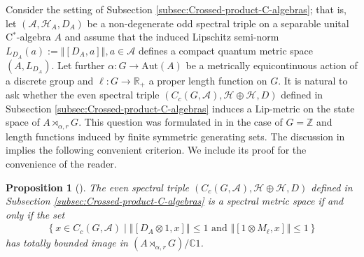 \documentclass[a4paper,11pt,reqno]{amsart}
\numberwithin{equation}{section}
\numberwithin{equation}{section}
\newtheorem{proposition}[theorem]{Proposition}
\theoremstyle{definition}
\theoremstyle{remark}
\theoremstyle{remark}
\begin{document}
Consider the setting of Subsection \ref{subsec:Crossed-product-C-algebras}; that is, let $(\mathcal{A},\mathcal{H}_{A},D_{A})$ be a non-degenerate
odd spectral triple on a separable unital C$^{\ast}$-algebra $A$
and assume that the induced Lipschitz semi-norm $L_{D_{A}}(a):=\left\Vert [D_{A},a]\right\Vert ,a\in\mathcal{A}$
defines a compact quantum metric space $(A,L_{D_{A}})$. Let further
$\alpha:G\rightarrow\text{Aut}(A)$ be a metrically equicontinuous
action of a discrete group and $\ell:G\rightarrow\mathbb{R}_{+}$
a proper length function on $G$. It is natural to ask whether the
even spectral triple $(C_{c}(G,\mathcal{A}),\mathcal{H}\oplus\mathcal{H},D)$
defined in Subsection \ref{subsec:Crossed-product-C-algebras} induces
a Lip-metric on the state space of $A\rtimes_{\alpha,r}G$. This question
was formulated in \cite{HSWZ13} in the case of $G=\mathbb{Z}$ and
length functions induced by finite symmetric generating sets. The
discussion in \cite[Subsection 2.3]{HSWZ13} implies the following
convenient criterion. We include its proof for the convenience of the reader.

\begin{proposition}[{\cite[Subsection 2.3]{HSWZ13}}] \label{QuantumMetricSpaceCharacterization}
The even spectral triple $(C_{c}(G,\mathcal{A}),\mathcal{H}\oplus\mathcal{H},D)$
defined in Subsection \ref{subsec:Crossed-product-C-algebras}
is a spectral metric space if and only if the set 
\begin{eqnarray}
\left\{ x\in C_{c}(G,\mathcal{A})\mid\left\Vert [D_{A}\otimes1,x]\right\Vert \leq1\text{ and }\left\Vert [1\otimes M_{\ell},x]\right\Vert \leq1\right\}  \label{set}
\end{eqnarray}
has totally bounded image in $(A\rtimes_{\alpha,r}G)/\mathbb{C}1$.
\end{proposition}
\end{document}
